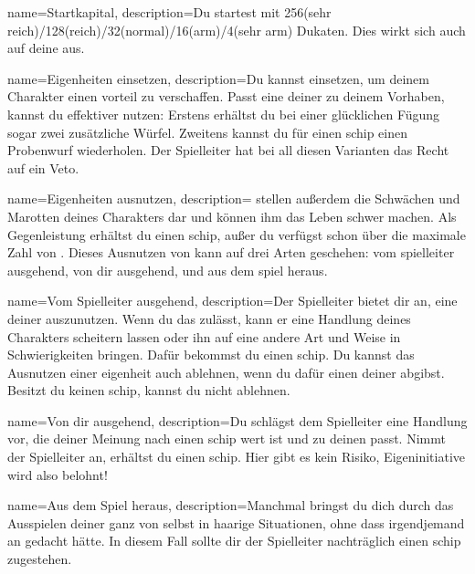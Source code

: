 {
    name={Startkapital},
    description={Du startest mit 256(sehr reich)/128(reich)/32(normal)/16(arm)/4(sehr arm) Dukaten. Dies wirkt sich auch auf deine  aus.}}

{
    name={Eigenheiten einsetzen},
    description={Du kannst  einsetzen, um deinem Charakter einen \gls{vorteil} zu verschaffen. Passt eine deiner  zu deinem Vorhaben, kannst du  effektiver nutzen: Erstens erhältst du bei einer glücklichen Fügung sogar zwei zusätzliche Würfel. Zweitens kannst du für einen \gls{schip} einen Probenwurf wiederholen. Der Spielleiter hat bei all diesen Varianten das Recht auf ein Veto.}}

{
    name={Eigenheiten ausnutzen},
    description={ stellen außerdem die Schwächen und Marotten deines Charakters dar und können ihm das Leben schwer machen. Als Gegenleistung erhältst du einen \gls{schip}, außer du verfügst schon über die maximale Zahl von . Dieses Ausnutzen von  kann auf drei Arten geschehen: \gls{vom spielleiter ausgehend}, \gls{von dir ausgehend}, und \gls{aus dem spiel heraus}.}}

{
    name={Vom Spielleiter ausgehend},
    description={Der Spielleiter bietet dir an, eine deiner  auszunutzen. Wenn du das zulässt, kann er eine Handlung deines Charakters scheitern lassen oder ihn auf eine andere Art und Weise in Schwierigkeiten bringen. Dafür bekommst du einen \gls{schip}. Du kannst das Ausnutzen einer \gls{eigenheit} auch ablehnen, wenn du dafür einen deiner  abgibst. Besitzt du keinen \gls{schip}, kannst du nicht ablehnen.}}

{
    name={Von dir ausgehend},
    description={Du schlägst dem Spielleiter eine Handlung vor, die deiner Meinung nach einen \gls{schip} wert ist und zu deinen  passt. Nimmt der Spielleiter an, erhältst du einen \gls{schip}. Hier gibt es kein Risiko, Eigeninitiative wird also belohnt!}}

{
    name={Aus dem Spiel heraus},
    description={Manchmal bringst du dich durch das Ausspielen deiner  ganz von selbst in haarige Situationen, ohne dass irgendjemand an  gedacht hätte. In diesem Fall sollte dir der Spielleiter nachträglich einen \gls{schip} zugestehen.}}

